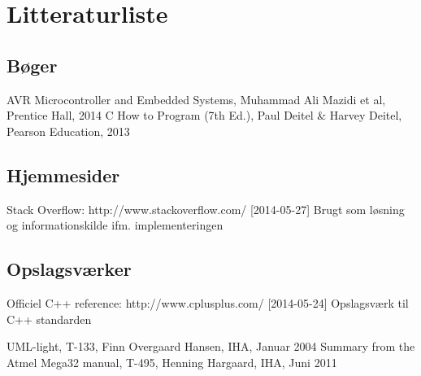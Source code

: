 \chapter{Litteraturliste}

\section{Bøger}
AVR Microcontroller and Embedded Systems, Muhammad Ali Mazidi et al, Prentice Hall, 2014 \newline
C How to Program (7th Ed.), Paul Deitel \& Harvey Deitel, Pearson Education, 2013

\section{Hjemmesider}
Stack Overflow: http://www.stackoverflow.com/ [2014-05-27] \newline
Brugt som løsning og informationskilde ifm. implementeringen

\section{Opslagsværker}
Officiel C++ reference: http://www.cplusplus.com/ [2014-05-24] \newline
Opslagsværk til C++ standarden

UML-light, T-133, Finn Overgaard Hansen, IHA, Januar 2004 \newline
Summary from the Atmel Mega32 manual, T-495, Henning Hargaard, IHA, Juni 2011 \newline

